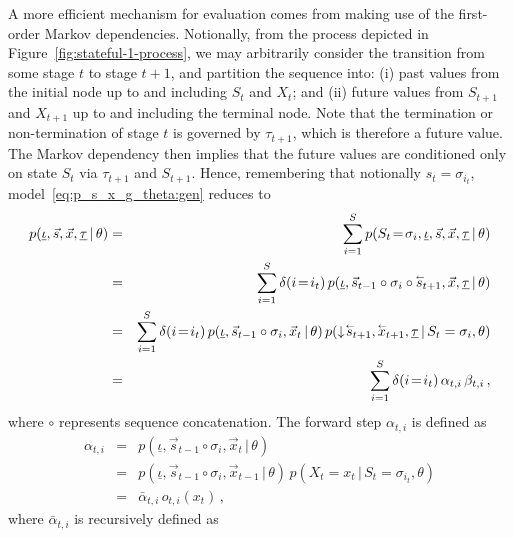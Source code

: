 \documentclass[a4paper]{article}
\newcommand{\rvec}[1]{\accentset{\leftarrow}{#1}}
\newcommand{\dn}{\downarrow\!}
\begin{document}
A more efficient mechanism for evaluation comes from making use of the first-order Markov dependencies.
Notionally, from the process depicted in Figure~\ref{fig:stateful-1-process}, we may arbitrarily consider the transition from 
some stage $t$ to stage $t+1$,
and partition the sequence into: (i) past values from the initial node up to and including $S_t$ and $X_t$;
and (ii) future values from $S_{t+1}$ and $X_{t+1}$ up to and including the terminal node.
Note that the termination or non-termination of stage $t$ is governed by $\tau_{t+1}$, which is
therefore a future value.
The Markov dependency then implies that the future values are conditioned only on state $S_t$
via $\tau_{t+1}$ and $S_{t+1}$.
Hence, remembering that notionally $s_t=\sigma_{i_t}$, model~\eqref{eq:p_s_x_g_theta:gen} reduces to
\begin{eqnarray}
   p(\underline{\iota},\vec{s},\vec{x},\underline{\tau}\,|\,\theta) 
& = &
   \sum_{i=1}^{S}p(S_t\!=\!\sigma_{i},\underline{\iota},\vec{s},\vec{x},\underline{\tau}\,|\,\theta) 
\nonumber\\& = & 
   \sum_{i=1}^{S}\delta(i\!=\!i_t)\,p(\underline{\iota},\vec{s}_{t-1}\circ\sigma_{i}\circ\rvec{s}_{t+1},\vec{x},\underline{\tau}\,|\,\theta) 
\nonumber\\& = & 
   \sum_{i=1}^{S}\delta(i\!=\!i_t)\,p(\underline{\iota},\vec{s}_{t-1}\circ\sigma_{i},\vec{x}_t\,|\,\theta) 
\,p(\dn\rvec{s}_{t+1},\rvec{x}_{t+1},\underline{\tau}\,|\,S_t=\sigma_{i},\theta) 
\nonumber\\& = &
  \sum_{i=1}^{S}\delta(i\!=\!i_t)\,\alpha_{t,i}\,\beta_{t,i}\,,
\label{eq:forward-backward}
\end{eqnarray}
where $\circ$ represents sequence concatenation.
The forward step $\alpha_{t,i}$ is defined as
\begin{eqnarray}
   \alpha_{t,i} & = & p(\underline{\iota},\vec{s}_{t-1}\circ\sigma_{i},\vec{x}_t\,|\,\theta) 
\nonumber\\& = &
   p(\underline{\iota},\vec{s}_{t-1}\circ\sigma_{i},\vec{x}_{t-1}\,|\,\theta) \,p(X_t\!=\!x_t\,|\,S_t\!=\!\sigma_{i_t},\theta)
\nonumber\\& = &
   \bar{\alpha}_{t,i}\,o_{t,i}(x_t)\,,
\label{eq:alpha}
\end{eqnarray}
where $\bar{\alpha}_{t,i}$ is recursively defined as
\end{document}
